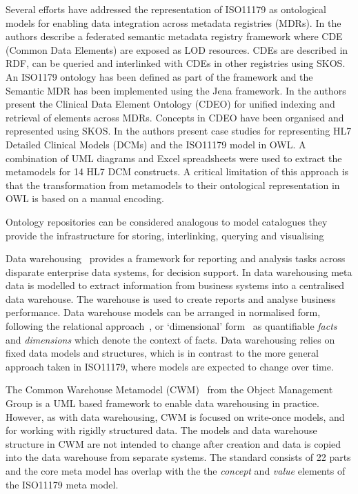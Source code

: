 


Several efforts have addressed the representation of ISO11179 as
ontological models for enabling data integration across metadata
registries (MDRs). In \cite{Sinaci2013784} the authors describe a
federated semantic metadata registry framework where CDE (Common Data
Elements) are exposed as LOD resources. CDEs are described in RDF, can
be queried and interlinked with CDEs in other registries using
SKOS. An ISO1179 ontology has been defined as part of the framework
and the Semantic MDR has been implemented using the Jena framework. In
\cite{pmid25405066} the authors present the Clinical Data Element
Ontology (CDEO) for unified indexing and retrieval of elements across
MDRs. Concepts in CDEO have been organised and represented using
SKOS. In \cite{pmid22211181} the authors present case studies for
representing HL7 Detailed Clinical Models (DCMs) and the ISO11179
model in OWL. A combination of UML diagrams and Excel spreadsheets
were used to extract the metamodels for 14 HL7 DCM constructs. A
critical limitation of this approach is that the transformation from
metamodels to their ontological representation in OWL is based on a
manual encoding.


Ontology repositories can be considered analogous to model catalogues
 they provide the infrastructure for storing, interlinking, querying and visualising 


Data warehousing~\cite{kim02} provides a framework for reporting and analysis tasks across disparate enterprise data systems, for decision support. In data warehousing meta data is modelled to extract information from business systems into a centralised data warehouse. The warehouse is used to create reports and analyse business performance. Data warehouse models can be arranged in normalised form, following the relational approach~\cite{inm92}, or `dimensional’ form~\cite{kim02} as quantifiable \emph{facts} and \emph{dimensions} which denote the context of facts. Data warehousing relies on fixed data models and structures, which is in contrast to the more general approach taken in ISO11179, where models are expected to change over time. 

The Common Warehouse Metamodel (CWM)~\cite{poole03} from the Object Management Group is a UML based framework to enable data warehousing in practice. However, as with data warehousing, CWM is focused on write-once models, and for working with rigidly structured data. The models and data warehouse structure in CWM are not intended to change after creation and data is copied into the data warehouse from separate systems. The standard consists of 22 parts and the core meta model has overlap with the the \emph{concept} and \emph{value} elements of the ISO11179 meta model.

